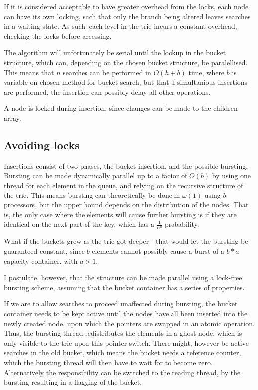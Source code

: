 If it is considered acceptable to have greater overhead from the locks, each
node can have its own locking, such that only the branch being altered
leaves searches in a waiting state. As such, each level in the trie incurs a
constant overhead, checking the locks before accessing.





The algorithm will unfortunately be serial until the lookup in the bucket
structure, which can, depending on the chosen bucket structure, be
paralellised. This means that $n$ searches can be performed in $O(h+b)$ time,
where $b$ is variable on chosen method for bucket search, but that if
simultanious insertions are performed, the insertion can possibly delay all
other operations. 

A node is locked during insertion, since changes can be made to the children
array.



\subsection{Avoiding locks}
Insertions consist of two phases, the bucket insertion, and the possible
bursting. Bursting can be made dynamically parallel up to a factor of $O(b)$ by
using one thread for each element in the queue, and relying on the recursive
structure of the trie. This means bursting can theoretically be done in
$\omega(1)$ using $b$ processors, but the upper bound depends on the
distribution of the nodes. That is, the only case where the elements will cause
further bursting is if they are identical on the next part of the key, which
has a $\frac{1}{\alpha^b}$ probability.

What if the buckets grew as the trie got deeper - that would let the bursting be
guaranteed constant, since $b$ elements cannot possibly cause a burst of a
$b*a$ capacity container, with $a > 1$.




I postulate, however, that the structure can be made parallel using a lock-free
bursting scheme, assuming that the bucket container has a series of properties.

If we are to allow searches to proceed unaffected during bursting, the bucket
container needs to be kept active until the nodes have all been inserted into the
newly created node, upon which the pointers are swapped in an atomic operation.
Thus, the bursting thread redistributes the elements in a ghost node, which is
only visible to the trie upon this pointer switch. There might, however be
active searches in the old bucket, which means the bucket needs a reference
counter, which the bursting thread will then have to wait for to become zero.
Alternatively the responsibility can be switched to the reading thread, by the
bursting resulting in a flagging of the bucket.

